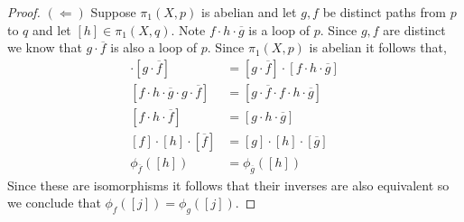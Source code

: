 \documentclass{homework651}
\begin{document}
\begin{problems}
\begin{proof}$(\Leftarrow)$ Suppose $\pi_1(X, p)$ is abelian and let $g, f$ be distinct paths from $p$ to $q$ and 
    let $[h] \in \pi_1(X, q)$. Note $f \cdot h \cdot \overline{g}$ is a loop of $p$. Since $g, f$ are distinct we know that $g \cdot \overline{f}$ is also a loop of $p$. 
    Since $\pi_1(X, p)$ is abelian it follows that, 
    \begin{align*}
        [f \cdot h \cdot \overline{g}]\cdot [g \cdot \overline{f}] &= [g \cdot \overline{f}] \cdot [f \cdot h \cdot \overline{g}]\\
        [f \cdot h \cdot \overline{g}\cdot g \cdot \overline{f}] &= [g \cdot \overline{f} \cdot f \cdot h \cdot \overline{g}]\\
        [f \cdot h \cdot \overline{f}] &= [g \cdot h \cdot \overline{g}]\\
        [f] \cdot [h] \cdot [\overline{f}] &= [g] \cdot [h] \cdot [\overline{g}]\\
        \phi_{\overline{f}}([h]) &= \phi_{\overline{g}}([h])
    \end{align*}
    Since these are isomorphisms it follows that their inverses are also equivalent so we conclude that $\phi_{f}([j]) = \phi_{g}([j])$. 
\end{proof}




\end{problems}
\end{document}
